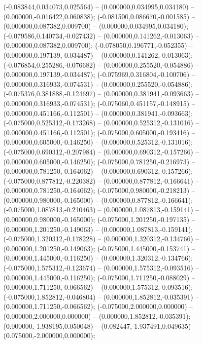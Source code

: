  (-0.083844,0.034073,0.025564) -- (0.000000,0.034995,0.034180) -- (0.000000,-0.016422,0.060838);
 (-0.081500,0.086670,-0.001585) -- (0.000000,0.087382,0.009700) -- (0.000000,0.034995,0.034180);
 (-0.079586,0.140734,-0.027432) -- (0.000000,0.141262,-0.013063) -- (0.000000,0.087382,0.009700);
 (-0.078050,0.196771,-0.052355) -- (0.000000,0.197139,-0.034487) -- (0.000000,0.141262,-0.013063);
 (-0.076854,0.255286,-0.076682) -- (0.000000,0.255520,-0.054886) -- (0.000000,0.197139,-0.034487);
 (-0.075969,0.316804,-0.100706) -- (0.000000,0.316933,-0.074531) -- (0.000000,0.255520,-0.054886);
 (-0.075376,0.381888,-0.124697) -- (0.000000,0.381941,-0.093663) -- (0.000000,0.316933,-0.074531);
 (-0.075060,0.451157,-0.148915) -- (0.000000,0.451166,-0.112501) -- (0.000000,0.381941,-0.093663);
 (-0.075000,0.525312,-0.173268) -- (0.000000,0.525312,-0.131016) -- (0.000000,0.451166,-0.112501);
 (-0.075000,0.605000,-0.193416) -- (0.000000,0.605000,-0.146250) -- (0.000000,0.525312,-0.131016);
 (-0.075000,0.690312,-0.207984) -- (0.000000,0.690312,-0.157266) -- (0.000000,0.605000,-0.146250);
 (-0.075000,0.781250,-0.216973) -- (0.000000,0.781250,-0.164062) -- (0.000000,0.690312,-0.157266);
 (-0.075000,0.877812,-0.220382) -- (0.000000,0.877812,-0.166641) -- (0.000000,0.781250,-0.164062);
 (-0.075000,0.980000,-0.218213) -- (0.000000,0.980000,-0.165000) -- (0.000000,0.877812,-0.166641);
 (-0.075000,1.087813,-0.210463) -- (0.000000,1.087813,-0.159141) -- (0.000000,0.980000,-0.165000);
 (-0.075000,1.201250,-0.197135) -- (0.000000,1.201250,-0.149063) -- (0.000000,1.087813,-0.159141);
 (-0.075000,1.320312,-0.178228) -- (0.000000,1.320312,-0.134766) -- (0.000000,1.201250,-0.149063);
 (-0.075000,1.445000,-0.153741) -- (0.000000,1.445000,-0.116250) -- (0.000000,1.320312,-0.134766);
 (-0.075000,1.575312,-0.123674) -- (0.000000,1.575312,-0.093516) -- (0.000000,1.445000,-0.116250);
 (-0.075000,1.711250,-0.088029) -- (0.000000,1.711250,-0.066562) -- (0.000000,1.575312,-0.093516);
 (-0.075000,1.852812,-0.046804) -- (0.000000,1.852812,-0.035391) -- (0.000000,1.711250,-0.066562);
 (-0.075000,2.000000,0.000000) -- (0.000000,2.000000,0.000000) -- (0.000000,1.852812,-0.035391);
 (0.000000,-1.938195,0.050048) -- (0.082447,-1.937491,0.049635) -- (0.075000,-2.000000,0.000000);
